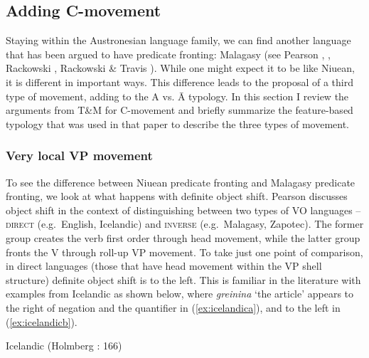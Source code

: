 \documentclass[output=paper,colorlinks,citecolor=brown,
]{langscibook}
\begin{document}
\subsection{Adding C-movement}

Staying within the Austronesian language family, we can find another language that has been argued to have predicate fronting: Malagasy (see Pearson \citeyear{Pearson:1997}, \citeyear{Pearson:2018}, Rackowski \citeyear{Rackowski:1998}, Rackowski \& Travis \citeyear{Rackowski:2000}).  While one might expect it to be  like Niuean, it is different in important ways.  This difference leads to the proposal of a third type of movement, adding to the A vs. \=A typology.  In this section I review the arguments from T\&M for C-movement and briefly summarize the feature-based typology that was used in that paper to describe the three types of movement.


\subsubsection{Very local VP movement}

To see the difference between Niuean predicate fronting and Malagasy predicate fronting, we look at what happens with definite object shift.  Pearson \citeyearpar{Pearson:2000} discusses object shift in the context of distinguishing between two types of VO languages -- \textsc{direct} (e.g.\ English, Icelandic) and \textsc{inverse} (e.g.\ Malagasy, Zapotec).  The former group creates the verb first order through head movement, while the latter group fronts the V through roll-up VP movement.  To take just one point of comparison, in direct languages (those that have head movement within the VP shell structure) definite object shift is to the left.  This is familiar in the literature with examples from Icelandic as shown below, where \textit{greinina} `the article' appears to the right of negation and the quantifier in (\ref{ex:icelandica}), and to the left in (\ref{ex:icelandicb}).  

\ea Icelandic (Holmberg \citeyear{Holmberg:1986}: 166)
    \z
\z
\end{document}
